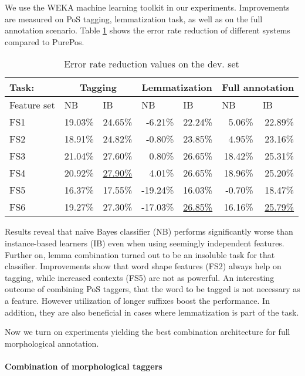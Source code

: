 We use the WEKA machine learning toolkit \cite{Hall2009} in our experiments.
Improvements are measured on PoS tagging, lemmatization task, as well as on the full annotation scenario.
Table \ref{tab:comb-reduction-rates} shows the error rate reduction of different systems compared to PurePos. 

\begin{table}[h]
\centering
\caption{Error rate reduction values on the dev. set}\label{tab:comb-reduction-rates}
\begin{tabular}{l r r r r r r}
\hline
Task:& \multicolumn{2}{c}{Tagging} & \multicolumn{2}{c}{Lemmatization} & \multicolumn{2}{c}{Full annotation} \\
\hline
Feature set & \multicolumn{1}{l}{NB} & \multicolumn{1}{l}{IB} & \multicolumn{1}{l}{NB} & \multicolumn{1}{l}{IB} & \multicolumn{1}{l}{NB} & \multicolumn{1}{l}{IB} \\
\hline
FS1 & 19.03\% & 24.65\% & -6.21\% & 22.24\% & 5.06\% & 22.89\% \\
FS2 & 18.91\% & 24.82\% & -0.80\% & 23.85\% & 4.95\% & 23.16\% \\
FS3 & 21.04\% & 27.60\% & 0.80\% & 26.65\% & 18.42\% & 25.31\% \\
FS4 & 20.92\% & \underline{27.90\%} & 4.01\% & 26.65\% & 18.96\% & 25.20\% \\
FS5 & 16.37\% & 17.55\% & -19.24\% & 16.03\% & -0.70\% & 18.47\% \\
FS6 & 19.27\% & 27.30\% & -17.03\% & \underline{26.85\%} & 16.16\% & \underline{25.79\%} \\
\hline
\end{tabular}
\end{table}

Results reveal that naïve Bayes classifier (NB) performs significantly worse than instance-based learners (IB) even when using seemingly independent features.
Further on, lemma combination turned out to be an insoluble task for that classifier.
Improvements show that word shape features (FS2) always help on tagging, while increased contexts (FS5) are not as powerful.
An interesting outcome of combining PoS taggers, that the word to be tagged is not necessary as a feature.
However utilization of longer suffixes boost the performance.
In addition, they are also beneficial in cases where lemmatization is part of the task. 

Now we turn on experiments yielding the best combination architecture for full morphological annotation.

\paragraph{Combination of morphological taggers}

